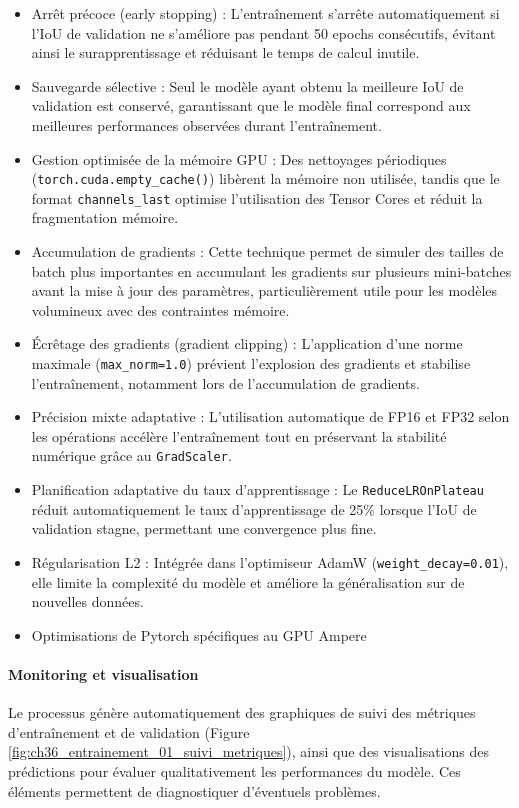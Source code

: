 \begin{itemize}
    \item Arrêt précoce (early stopping) : L'entraînement s'arrête automatiquement si l'IoU de validation ne s'améliore pas pendant 50 epochs consécutifs, évitant ainsi le surapprentissage et réduisant le temps de calcul inutile.
    \item Sauvegarde sélective : Seul le modèle ayant obtenu la meilleure IoU de validation est conservé, garantissant que le modèle final correspond aux meilleures performances observées durant l'entraînement.
    \item Gestion optimisée de la mémoire GPU : Des nettoyages périodiques \\ (\texttt{torch.cuda.empty\_cache()}) libèrent la mémoire non utilisée, tandis que le format \texttt{channels\_last} optimise l'utilisation des Tensor Cores et réduit la fragmentation mémoire.
    \item Accumulation de gradients : Cette technique permet de simuler des tailles de batch plus importantes en accumulant les gradients sur plusieurs mini-batches avant la mise à jour des paramètres, particulièrement utile pour les modèles volumineux avec des contraintes mémoire.
    \item Écrêtage des gradients (gradient clipping) : L'application d'une norme maximale (\texttt{max\_norm=1.0}) prévient l'explosion des gradients et stabilise l'entraînement, notamment lors de l'accumulation de gradients.
    \item Précision mixte adaptative : L'utilisation automatique de FP16 et FP32 selon les opérations accélère l'entraînement tout en préservant la stabilité numérique grâce au \texttt{GradScaler}.
    \item Planification adaptative du taux d'apprentissage : Le \texttt{ReduceLROnPlateau} réduit automatiquement le taux d'apprentissage de 25\% lorsque l'IoU de validation stagne, permettant une convergence plus fine.
    \item Régularisation L2 : Intégrée dans l'optimiseur AdamW (\texttt{weight\_decay=0.01}), elle limite la complexité du modèle et améliore la généralisation sur de nouvelles données.
    \item Optimisations de Pytorch spécifiques au GPU Ampere
\end{itemize}

\paragraph{Monitoring et visualisation}
Le processus génère automatiquement des graphiques de suivi des métriques d'entraînement et de validation (Figure \ref{fig:ch36_entrainement_01_suivi_metriques}), ainsi que des visualisations des prédictions pour évaluer qualitativement les performances du modèle. Ces éléments permettent de diagnostiquer d'éventuels problèmes.

